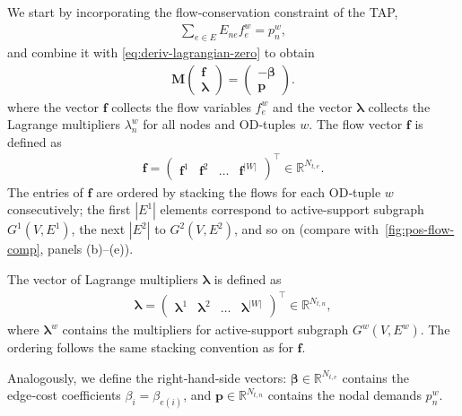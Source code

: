 \documentclass[twocolumn,english,groupedaddress, superscriptaddress,aps,pre,10pt,floatfix]{revtex4-2}
\newcommand{\matr}[1]{{\boldsymbol{#1}}}
\renewcommand{\vec}[1]{{\boldsymbol{#1}}}
\begin{document}
We start by incorporating the flow‑conservation constraint of the TAP,
\begin{align}
   \sum_{e\in E}E_{ne}f_e^{w}=p_n^{w},
\end{align}
and combine it with \cref{eq:deriv-lagrangian-zero} to obtain
\begin{align}
\matr{M}
\begin{pmatrix}
\vec{f}\\ \boldsymbol{\lambda}
\end{pmatrix}
=
\begin{pmatrix}
-\boldsymbol{\beta}\\ \vec{p}
\end{pmatrix}.
\end{align}
where the vector $\vec{f}$ collects the flow variables $f_e^{w}$ and the vector $\boldsymbol{\lambda}$ collects the Lagrange multipliers $\lambda_n^{w}$ for all nodes and OD‑tuples $w$.
The flow vector $\vec{f}$ is defined as
\begin{align}
\vec{f}=
\begin{pmatrix}
\vec{f}^{1}&\vec{f}^{2}&\dots&\vec{f}^{|W|}
\end{pmatrix}^{\!\top}
\in\mathbb{R}^{N_{t,e}}.
\end{align}
The entries of $\vec{f}$ are ordered by stacking the flows for each OD‑tuple $w$ consecutively; the first $|E^{1}|$ elements correspond to active-support subgraph $G^{1}(V,E^{1})$, the next $|E^{2}|$ to $G^{2}(V,E^{2})$, and so on (compare with~\cref{fig:pos-flow-comp}, panels (b)–(e)).

The vector of Lagrange multipliers $\boldsymbol{\lambda}$ is defined as
\begin{align}
\boldsymbol{\lambda}=
\begin{pmatrix}
\vec{\lambda}^{1}&\vec{\lambda}^{2}&\dots&\vec{\lambda}^{|W|}
\end{pmatrix}^{\!\top}
\in\mathbb{R}^{N_{t,n}},
\end{align}
where $\vec{\lambda}^{w}$ contains the multipliers for active-support subgraph $G^{w}(V,E^{w})$. The ordering follows the same stacking convention as for $\vec{f}$.

Analogously, we define the right‑hand‑side vectors: $\boldsymbol{\beta}\in\mathbb{R}^{N_{t,e}}$ contains the edge‑cost coefficients $\beta_i=\beta_{e(i)}$, and $\vec{p}\in\mathbb{R}^{N_{t,n}}$ contains the nodal demands $p_n^{w}$.
\end{document}
